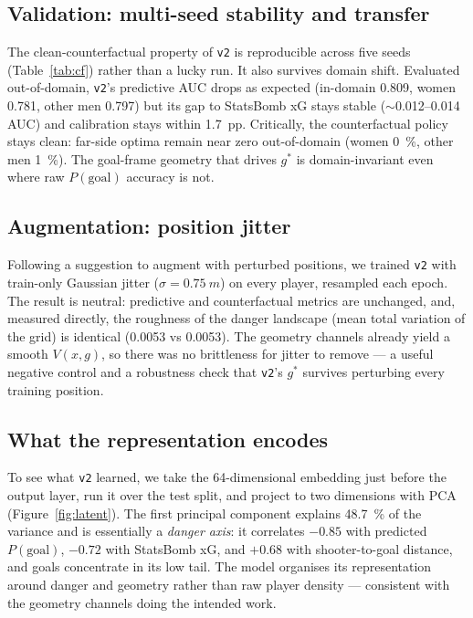 \documentclass[11pt,a4paper]{article}
\newcommand{\gopt}{g^{*}}
\newcommand{\V}{V}
\begin{document}
\subsection{Validation: multi-seed stability and transfer}
\label{sec:results-transfer}
The clean-counterfactual property of \texttt{v2} is reproducible across five
seeds (Table~\ref{tab:cf}) rather than a lucky run. It also survives domain
shift. Evaluated out-of-domain, \texttt{v2}'s predictive AUC drops as expected
(in-domain \num{0.809}, women \num{0.781}, other men \num{0.797}) but its gap to
StatsBomb xG stays stable ($\sim$\numrange{0.012}{0.014} AUC) and calibration
stays within \num{1.7}~pp. Critically, the counterfactual policy stays clean:
far-side optima remain near zero out-of-domain (women \SI{0}{\percent}, other men
\SI{1}{\percent}). The goal-frame geometry that drives $\gopt$ is
domain-invariant even where raw $P(\text{goal})$ accuracy is not.

\subsection{Augmentation: position jitter}
Following a suggestion to augment with perturbed positions, we trained
\texttt{v2} with train-only Gaussian jitter ($\sigma=\SI{0.75}{m}$) on every
player, resampled each epoch. The result is neutral: predictive and
counterfactual metrics are unchanged, and, measured directly, the roughness of
the danger landscape (mean total variation of the grid) is identical
(\num{0.0053} vs \num{0.0053}). The geometry channels already yield a smooth
$\V(x,g)$, so there was no brittleness for jitter to remove --- a useful negative
control and a robustness check that \texttt{v2}'s $\gopt$ survives perturbing
every training position.

\subsection{What the representation encodes}
To see what \texttt{v2} learned, we take the \num{64}-dimensional embedding just
before the output layer, run it over the test split, and project to two
dimensions with PCA (Figure~\ref{fig:latent}). The first principal component
explains \SI{48.7}{\percent} of the variance and is essentially a
\emph{danger axis}: it correlates $-0.85$ with predicted $P(\text{goal})$,
$-0.72$ with StatsBomb xG, and $+0.68$ with shooter-to-goal distance, and goals
concentrate in its low tail. The model organises its representation around danger
and geometry rather than raw player density --- consistent with the geometry
channels doing the intended work.
\end{document}
